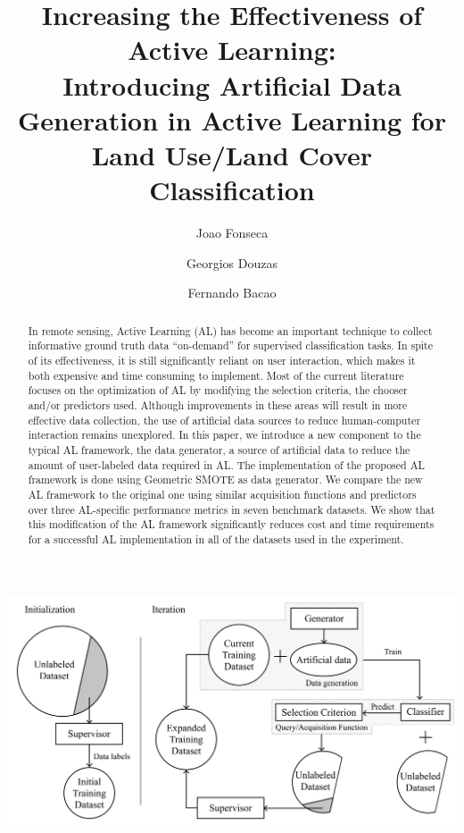 \documentclass[preprint,12pt]{elsarticle}
\date{}
\begin{document}
\begin{frontmatter}

\title{
    Increasing the Effectiveness of Active Learning:\\
    Introducing Artificial Data Generation in Active Learning for Land Use/Land Cover Classification}


\author[inst1]{Joao Fonseca} 
\author[inst1]{Georgios Douzas}
\author[inst1]{Fernando Bacao}


\begin{abstract}
    In remote sensing, Active Learning (AL) has become an important technique
    to collect informative ground truth data ``on-demand'' for supervised
    classification tasks. In spite of its effectiveness, it is still
    significantly reliant on user interaction, which makes it both expensive
    and time consuming to implement. Most of the current literature focuses on
    the optimization of AL by modifying the selection criteria, the chooser
    and/or predictors used. Although improvements in these areas will result
    in more effective data collection, the use of artificial data sources to
    reduce human-computer interaction remains unexplored. In this paper, we
    introduce a new component to the typical AL framework, the data generator,
    a source of artificial data to reduce the amount of user-labeled data
    required in AL\@. The implementation of the proposed AL framework is done
    using Geometric SMOTE as data generator. We compare the new AL framework
    to the original one using similar acquisition functions and predictors
    over three AL-specific performance metrics in seven benchmark datasets. We
    show that this modification of the AL framework significantly reduces cost
    and time requirements for a successful AL implementation in all of the
    datasets used in the experiment. 
\end{abstract}


\begin{graphicalabstract}
\centering
\includegraphics[width=.85\linewidth]{../analysis/graphical_abstract}
\end{graphicalabstract}


\end{frontmatter}
\end{document}
